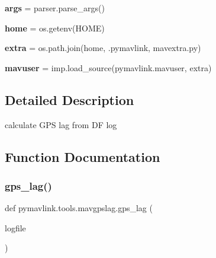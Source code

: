 \begin{DoxyCompactItemize}
{\bfseries args} = parser.\+parse\+\_\+args()
\item 
\mbox{\label{namespacepymavlink_1_1tools_1_1mavgpslag_a7d947985d356bb2b85e842c2cc11efa5}} 
{\bfseries home} = os.\+getenv(\textquotesingle{}H\+O\+ME\textquotesingle{})
\item 
\mbox{\label{namespacepymavlink_1_1tools_1_1mavgpslag_ac52ac91c0c51a00372c6261a1a0adbf7}} 
{\bfseries extra} = os.\+path.\+join(home, \textquotesingle{}.pymavlink\textquotesingle{}, \textquotesingle{}mavextra.\+py\textquotesingle{})
\item 
\mbox{\label{namespacepymavlink_1_1tools_1_1mavgpslag_a621711512b09f6681db4710c610295e8}} 
{\bfseries mavuser} = imp.\+load\+\_\+source(\textquotesingle{}pymavlink.\+mavuser\textquotesingle{}, extra)
\end{DoxyCompactItemize}


\subsection{Detailed Description}
\begin{DoxyVerb}calculate GPS lag from DF log
\end{DoxyVerb}
 

\subsection{Function Documentation}
\mbox{\label{namespacepymavlink_1_1tools_1_1mavgpslag_af4a2cfb91f46374a5585be6ab70d5f4e}} 
\subsubsection{\texorpdfstring{gps\+\_\+lag()}{gps\_lag()}}
{\footnotesize\ttfamily def pymavlink.\+tools.\+mavgpslag.\+gps\+\_\+lag (\begin{DoxyParamCaption}\item[{}]{logfile }\end{DoxyParamCaption})}

